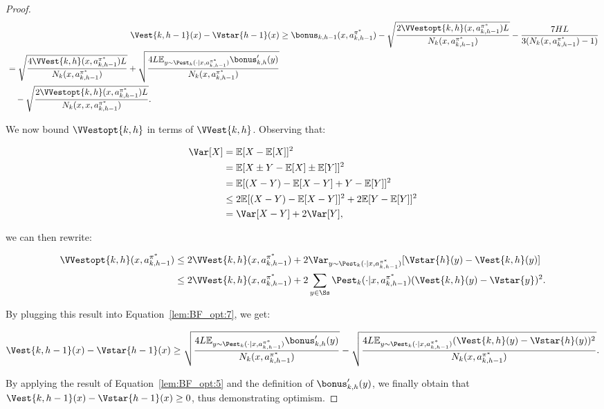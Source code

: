 \begin{proof}
\begin{align}
    \Vest{k,h-1}(x) - \Vstar{h-1}(x) &\ge \bonus_{k, h-1}(x, a_{k,h-1}^{\pi^*}) - \sqrt{\frac{2 \VVestopt{k,h}(x, a_{k,h-1}^{\pi^*})L}{N_k (x, a_{k,h-1}^{\pi^*})}} - \frac{7 HL}{3 (N_k(x, a_{k,h-1}^{\pi^*})-1)} \nonumber \\
    \begin{split}
    \label{lem:BF_opt:7}
    &= \sqrt{\frac{4 \VVest{k,h}(x, a_{k,h-1}^{\pi^*})L}{N_k (x, a_{k,h-1}^{\pi^*})}} + \sqrt{\frac{4L \mathbb{E}_{y \sim \Pest_k (\cdot | x, a_{k,h-1}^{\pi^*})}\bonus'_{k,h}(y)}{N_k (x, a_{k,h-1}^{\pi^*})}} \\
    &\quad - \sqrt{\frac{2 \VVestopt{k,h}(x, a_{k,h-1}^{\pi^*})L}{N_k (x,x, a_{k,h-1}^{\pi^*})}}.
    \end{split}
\end{align}

We now bound $\VVestopt{k, h}$ in terms of $\VVest{k, h}$. Observing that:

\begin{align*}
    \Var[X] &= \mathbb{E}[X - \mathbb{E}[X]]^2 \\
    &= \mathbb{E}[X \pm Y - \mathbb{E}[X] \pm \mathbb{E}[Y]]^2 \\
    &= \mathbb{E}[(X-Y) - \mathbb{E}[X-Y] + Y - \mathbb{E}[Y]]^2 \\
    &\le 2 \mathbb{E}[(X-Y) - \mathbb{E}[X-Y]]^2 + 2 \mathbb{E}[Y - \mathbb{E}[Y]]^2 \\
    &= \Var[X-Y] + 2 \Var[Y],
\end{align*}

we can then rewrite:

\begin{align*}
    \VVestopt{k, h}(x, a_{k,h-1}^{\pi^*}) &\le 2 \VVest{k, h}(x, a_{k,h-1}^{\pi^*}) + 2 \Var_{y \sim \Pest_k (\cdot | x, a_{k,h-1}^{\pi^*})} [\Vstar{h}(y) - \Vest{k,h}(y)] \\
    &\le 2 \VVest{k, h}(x, a_{k,h-1}^{\pi^*}) + 2 \sum_{y \in \Ss} \Pest_k (\cdot | x, a_{k,h-1}^{\pi^*}) (\Vest{k,h}(y) - \Vstar{y})^2.
\end{align*}

By plugging this result into Equation~\eqref{lem:BF_opt:7}, we get:

\begin{equation*}
    \Vest{k,h-1}(x) - \Vstar{h-1}(x) \ge \sqrt{\frac{4L \mathbb{E}_{y \sim \Pest_k (\cdot | x, a_{k,h-1}^{\pi^*})}\bonus'_{k,h}(y)}{N_k (x, a_{k,h-1}^{\pi^*})}} - \sqrt{\frac{4L \mathbb{E}_{y \sim \Pest_k (\cdot | x, a_{k,h-1}^{\pi^*})}(\Vest{k,h}(y) - \Vstar{h}(y))^2}{N_k (x, a_{k,h-1}^{\pi^*})}}.
\end{equation*}

By applying the result of Equation~\eqref{lem:BF_opt:5} and the definition of $\bonus'_{k,h}(y)$, we finally obtain that $\Vest{k,h-1}(x) - \Vstar{h-1}(x) \ge 0$, thus demonstrating optimism.
\end{proof}

